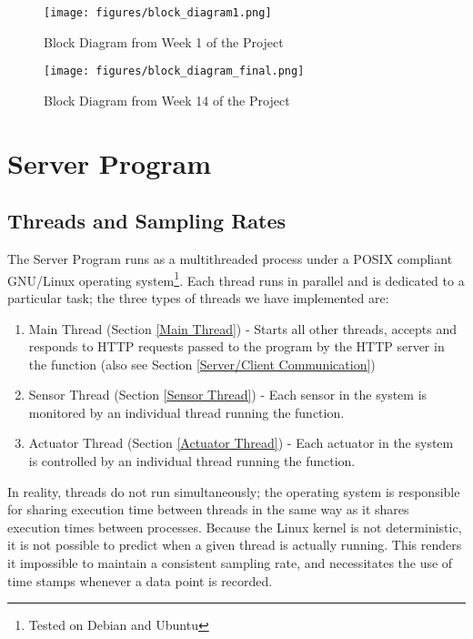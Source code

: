 \begin{figure}[H]
	\centering
	\texttt{[image: figures/block\_diagram1.png]}
	\caption{Block Diagram from Week 1 of the Project}
	\label{block_diagram1.png}
\end{figure}


\begin{figure}[H]
	\centering
	\texttt{[image: figures/block\_diagram\_final.png]}
	\caption{Block Diagram from Week 14 of the Project}
	\label{block_diagram_final.png}
\end{figure}

\section{Server Program}\label{Server Program}

\subsection{Threads and Sampling Rates}

The Server Program runs as a multithreaded process under a POSIX compliant GNU/Linux operating system\footnote{Tested on Debian and Ubuntu}. Each thread runs in parallel and is dedicated to a particular task; the three types of threads we have implemented are:
\begin{enumerate}
  \item Main Thread (Section \ref{Main Thread}) - Starts all other threads, accepts and responds to HTTP requests passed to the program by the HTTP server in the  function (also see Section \ref{Server/Client Communication})
  \item Sensor Thread (Section \ref{Sensor Thread}) - Each sensor in the system is monitored by an individual thread running the  function.
  \item Actuator Thread (Section \ref{Actuator Thread}) - Each actuator in the system is controlled by an individual thread running the  function.
\end{enumerate}


In reality, threads do not run simultaneously; the operating system is responsible for sharing execution time between threads in the same way as it shares execution times between processes. Because the Linux kernel is not deterministic, it is not possible to predict when a given thread is actually running. This renders it impossible to maintain a consistent sampling rate, and necessitates the use of time stamps whenever a data point is recorded. 

